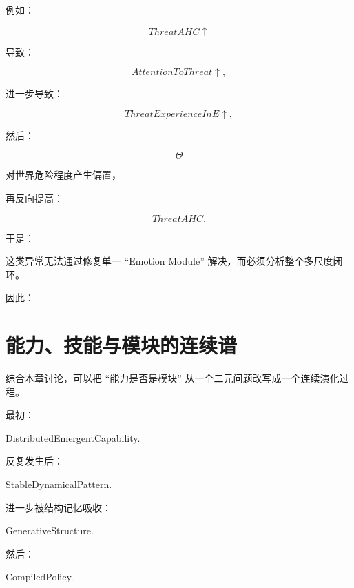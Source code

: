 例如：

\[
ThreatAHC\uparrow
\]

导致：

\[
AttentionToThreat\uparrow,
\]

进一步导致：

\[
ThreatExperienceInE\uparrow,
\]

然后：

\[
\Theta
\]

对世界危险程度产生偏置，

再反向提高：

\[
ThreatAHC.
\]

于是：

\begin{statementbox}
\centering
{}
\end{statementbox}

这类异常无法通过修复单一 ``Emotion Module'' 解决，而必须分析整个多尺度闭环。

因此：

\begin{statementbox}
\centering
{}
\end{statementbox}

\section{能力、技能与模块的连续谱}

综合本章讨论，可以把 ``能力是否是模块'' 从一个二元问题改写成一个连续演化过程。

最初：

\begin{statementbox}
DistributedEmergentCapability.
\end{statementbox}

反复发生后：

\begin{statementbox}
StableDynamicalPattern.
\end{statementbox}

进一步被结构记忆吸收：

\begin{statementbox}
GenerativeStructure.
\end{statementbox}

然后：

\begin{statementbox}
CompiledPolicy.
\end{statementbox}


